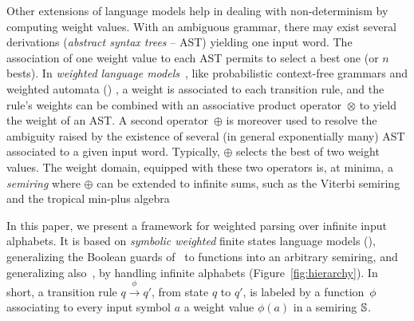 Other extensions of language models  %
help in dealing with non-determinism by computing weight values.
With an ambiguous grammar, there may exist several derivations
(\emph{abstract syntax trees} -- AST) %
yielding one input word. %
The association of one weight value %
to each AST permits to select a best one (or $n$ bests). %
In \emph{weighted language models}~\cite{Goodman99SemiringParsing,Nederhof03weightedParsing,MorbitzVogler19weighted-parsing},
like \eg probabilistic context-free grammars %
and weighted automata (\WA) \cite{Droste09handbook},
a weight is associated to each transition rule, %
and the rule's weights can be combined with an
associative product operator~$\otimes$ to yield the weight of an AST.
A second operator~$\oplus$
is moreover used to resolve the ambiguity raised by the existence
of several (in general exponentially many) AST
associated to a given input word.
Typically, $\oplus$  selects the best of two weight values.
The weight domain, equipped with these two operators is, at minima,
a \emph{semiring} %
where $\oplus$ can be extended to infinite sums,
such as the Viterbi semiring and the tropical min-plus algebra%

In this paper, we present a framework for weighted parsing over infinite input alphabets.
It is based on \emph{symbolic weighted} finite states language models (\swM),
generalizing the Boolean guards of~\SA %
to functions into an arbitrary semiring,
and generalizing also~\WA, by handling infinite alphabets (Figure~\ref{fig:hierarchy}).
%
In short, a transition rule $q \xrightarrow{\phi} q'$, from state $q$ to $q'$,
is labeled by a function~$\phi$ associating to every input symbol $a$ a weight value $\phi(a)$
in a semiring $\mathbb{S}$.


